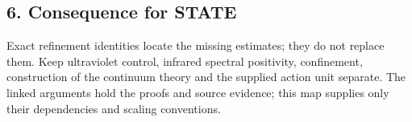 \documentclass[11pt,a4paper]{article}
\begin{document}
\hypertarget{consequence-for-state}{%
\subsection{6. Consequence for STATE}\label{consequence-for-state}}

Exact refinement identities locate the missing estimates; they do not
replace them. Keep ultraviolet control, infrared spectral positivity,
confinement, construction of the continuum theory and the supplied
action unit separate. The linked arguments hold the proofs and source
evidence; this map supplies only their dependencies and scaling
conventions.
\end{document}
